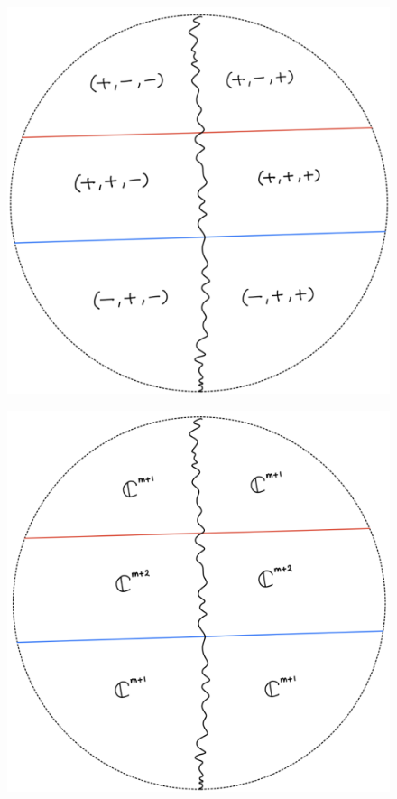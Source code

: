 \begin{figure}[H]
    \centering
    \includegraphics[scale = 0.45]{diagrams/lemma3/26.png} 
    \caption{}
    \label{fig:your-label}
\end{figure}
\begin{figure}[H]
    \centering
    \includegraphics[scale = 0.45]{diagrams/lemma3/27.png} 
    \caption{}
    \label{fig:your-label}
\end{figure}
